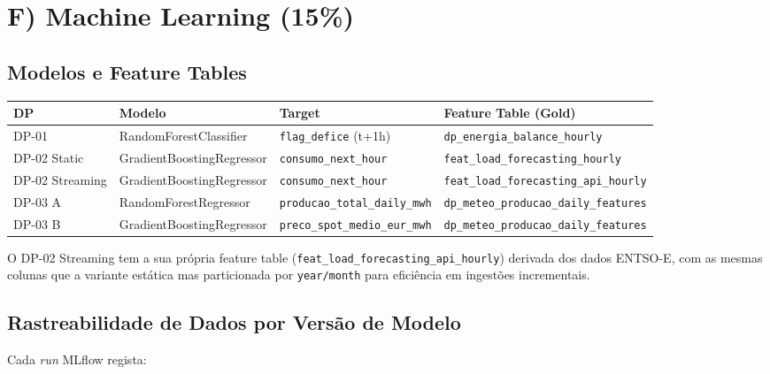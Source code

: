\documentclass[11pt,a4paper]{article}
\begin{document}
\section{F) Machine Learning (15\%)}

\subsection{Modelos e Feature Tables}

\begin{table}[h!]
\centering
\begin{tabularx}{\linewidth}{lllX}
\toprule
\textbf{DP} & \textbf{Modelo} & \textbf{Target} & \textbf{Feature Table (Gold)} \\
\midrule
DP-01 & RandomForestClassifier & \texttt{flag\_defice} (t+1h) & \texttt{dp\_energia\_balance\_hourly} \\
DP-02 Static & GradientBoostingRegressor & \texttt{consumo\_next\_hour} & \texttt{feat\_load\_forecasting\_hourly} \\
DP-02 Streaming & GradientBoostingRegressor & \texttt{consumo\_next\_hour} & \texttt{feat\_load\_forecasting\_api\_hourly} \\
DP-03 A & RandomForestRegressor & \texttt{producao\_total\_daily\_mwh} & \texttt{dp\_meteo\_producao\_daily\_features} \\
DP-03 B & GradientBoostingRegressor & \texttt{preco\_spot\_medio\_eur\_mwh} & \texttt{dp\_meteo\_producao\_daily\_features} \\
\bottomrule
\end{tabularx}
\end{table}

O DP-02 Streaming tem a sua própria feature table (\texttt{feat\_load\_forecasting\_api\_hourly}) derivada dos dados ENTSO-E, com as mesmas colunas que a variante estática mas particionada por \texttt{year/month} para eficiência em ingestões incrementais.

\subsection{Rastreabilidade de Dados por Versão de Modelo}

Cada \textit{run} MLflow regista:
\end{document}
